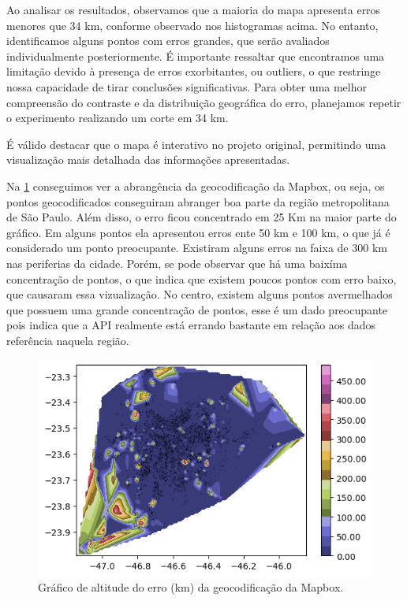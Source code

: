 Ao analisar os resultados, observamos que a maioria do mapa apresenta erros menores que 34 km, conforme observado nos histogramas acima. No entanto, identificamos alguns pontos com erros grandes, que serão avaliados individualmente posteriormente. É importante ressaltar que encontramos uma limitação devido à presença de erros exorbitantes, ou outliers, o que restringe nossa capacidade de tirar conclusões significativas. Para obter uma melhor compreensão do contraste e da distribuição geográfica do erro, planejamos repetir o experimento realizando um corte em 34 km.

É válido destacar que o mapa é interativo no projeto original, permitindo uma visualização mais detalhada das informações apresentadas.

Na \ref{fig:grafAltM} conseguimos ver a abrangência da geocodificação da Mapbox, ou seja, os pontos geocodificados conseguiram abranger boa parte da região metropolitana de São Paulo. Além disso, o erro ficou concentrado em 25 Km na maior parte do gráfico. Em alguns pontos ela apresentou erros ente 50 km e 100 km, o que já é considerado um ponto preocupante. Existiram alguns erros na faixa de 300 km nas periferias da cidade. Porém, se pode observar que há uma baixíma concentração de pontos, o que indica que existem poucos pontos com erro baixo, que causaram essa vizualização. No centro, existem alguns pontos avermelhados que possuem uma grande concentração de pontos, esse é um dado preocupante pois indica que a API realmente está errando bastante em relação aos dados referência naquela região.

\begin{figure}[h] 
  \centering
  \includegraphics[width=\textwidth]{Figuras/graficoAltPontosMapbox.png}
  \caption{Gráfico de altitude do erro (km) da geocodificação da Mapbox.}
  \label{fig:grafAltM}
\end{figure}

